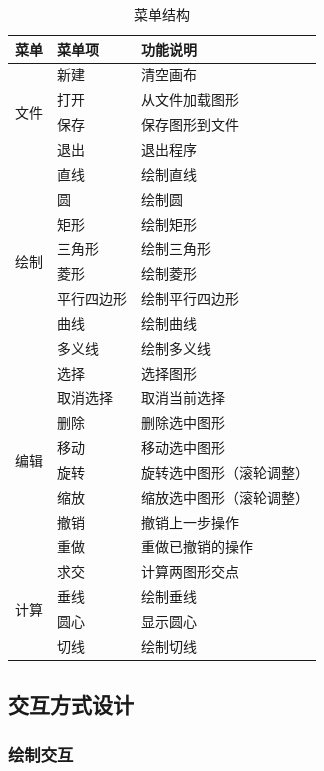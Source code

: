 \documentclass[12pt,a4paper]{article}
\begin{document}
\begin{table}[H]
\centering
\caption{菜单结构}
\begin{tabular}{|l|l|l|}
\hline
\textbf{菜单} & \textbf{菜单项} & \textbf{功能说明} \\
\hline
\multirow{4}{*}{文件} & 新建 & 清空画布 \\
\cline{2-3}
& 打开 & 从文件加载图形 \\
\cline{2-3}
& 保存 & 保存图形到文件 \\
\cline{2-3}
& 退出 & 退出程序 \\
\hline
\multirow{8}{*}{绘制} & 直线 & 绘制直线 \\
\cline{2-3}
& 圆 & 绘制圆 \\
\cline{2-3}
& 矩形 & 绘制矩形 \\
\cline{2-3}
& 三角形 & 绘制三角形 \\
\cline{2-3}
& 菱形 & 绘制菱形 \\
\cline{2-3}
& 平行四边形 & 绘制平行四边形 \\
\cline{2-3}
& 曲线 & 绘制曲线 \\
\cline{2-3}
& 多义线 & 绘制多义线 \\
\hline
\multirow{8}{*}{编辑} & 选择 & 选择图形 \\
\cline{2-3}
& 取消选择 & 取消当前选择 \\
\cline{2-3}
& 删除 & 删除选中图形 \\
\cline{2-3}
& 移动 & 移动选中图形 \\
\cline{2-3}
& 旋转 & 旋转选中图形（滚轮调整） \\
\cline{2-3}
& 缩放 & 缩放选中图形（滚轮调整） \\
\cline{2-3}
& 撤销 & 撤销上一步操作 \\
\cline{2-3}
& 重做 & 重做已撤销的操作 \\
\hline
\multirow{4}{*}{计算} & 求交 & 计算两图形交点 \\
\cline{2-3}
& 垂线 & 绘制垂线 \\
\cline{2-3}
& 圆心 & 显示圆心 \\
\cline{2-3}
& 切线 & 绘制切线 \\
\hline
\end{tabular}
\end{table}

\subsection{交互方式设计}

\subsubsection{绘制交互}
\end{document}
